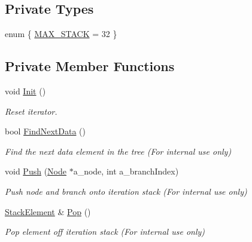 \subsection*{Private Types}
\begin{DoxyCompactItemize}
\item 
enum \{ \hyperlink{classRTree_1_1Iterator_a1e45c4c1d6d735b999df1cbe1a0e36ada26b6ad9c0a591145b71370b87ce125e8}{M\-A\-X\-\_\-\-S\-T\-A\-C\-K} = 32
 \}
\end{DoxyCompactItemize}
\subsection*{Private Member Functions}
\begin{DoxyCompactItemize}
\item 
void \hyperlink{classRTree_1_1Iterator_a923e4fe7dc813630c4b20b8468f9dcc7}{Init} ()
\begin{DoxyCompactList}\small\item\em Reset iterator. \end{DoxyCompactList}\item 
bool \hyperlink{classRTree_1_1Iterator_ae1dc5968481efa8c8c916323472b159b}{Find\-Next\-Data} ()
\begin{DoxyCompactList}\small\item\em Find the next data element in the tree (For internal use only) \end{DoxyCompactList}\item 
void \hyperlink{classRTree_1_1Iterator_afb35dcd6c652052684d5e8801d9cda7c}{Push} (\hyperlink{structRTree_1_1Node}{Node} $\ast$a\-\_\-node, int a\-\_\-branch\-Index)
\begin{DoxyCompactList}\small\item\em Push node and branch onto iteration stack (For internal use only) \end{DoxyCompactList}\item 
\hyperlink{structRTree_1_1Iterator_1_1StackElement}{Stack\-Element} \& \hyperlink{classRTree_1_1Iterator_a6f75eaf8c9ebe60f4a8cacbb7f4998fe}{Pop} ()
\begin{DoxyCompactList}\small\item\em Pop element off iteration stack (For internal use only) \end{DoxyCompactList}\end{DoxyCompactItemize}

